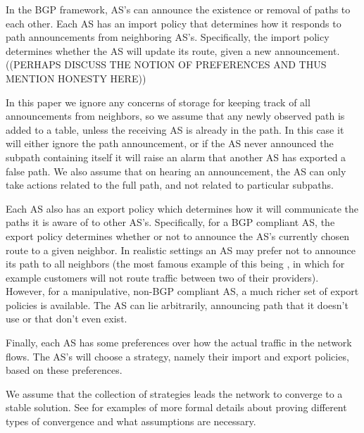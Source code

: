 \documentclass[10pt]{article}
\begin{document}
    In the BGP framework, AS's can announce the
    existence or removal of paths to each other.
    Each AS has an import policy that
    determines how it responds to path announcements from neighboring AS's.
    Specifically, the import policy determines whether the AS will update
    its route, given a new announcement.
    ((PERHAPS DISCUSS THE NOTION OF PREFERENCES AND THUS MENTION HONESTY HERE))

    In this paper we ignore any concerns of storage for keeping track of all
    announcements from neighbors, so we assume that any newly observed path is
    added to a table, unless the receiving AS is already in the path.
    In this case
    it will either ignore the path announcement, or if the AS never announced the
    subpath containing itself it will raise an alarm that another AS has exported
    a false path.
    We also assume that on hearing an announcement, the AS can only
    take actions related to the full path, and not related to particular subpaths.

    Each AS also has an export policy which determines how it will communicate the
    paths it is aware of to other AS's.
    Specifically, for a BGP compliant AS, the export policy determines
    whether or not to announce the AS's currently chosen route to a given neighbor.
    In realistic settings an AS may prefer not to announce its path to all neighbors
    (the most famous example of this being \cite{GaoRexford},
    in which for example customers will not route traffic
    between two of their providers).
    However, for a manipulative, non-BGP compliant AS,
    a much richer set of export policies is available.
    The AS can lie arbitrarily, announcing path that it doesn't use
    or that don't even exist.

    Finally, each AS has some preferences over how the actual traffic in the
    network flows. The AS's will choose a strategy, namely their import and export
    policies, based on these preferences.

    We assume that the collection of strategies leads the network to converge to a
    stable solution. See \cite{RoutingGames, Attraction, StablePaths, PolicyPathVector}
    for examples of more formal details about proving different types of convergence
    and what assumptions are necessary.
\end{document}
